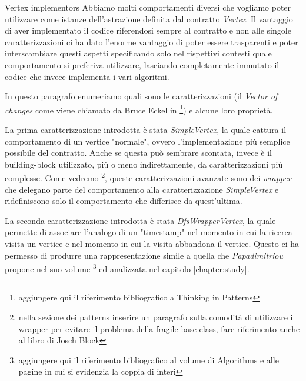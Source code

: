 \begin{paragraph}{Vertex implementors}
  Abbiamo molti comportamenti diversi che vogliamo poter utilizzare
  come istanze dell'astrazione definita dal contratto
  \emph{Vertex}. Il vantaggio di aver implementato il codice
  riferendosi sempre al contratto e non alle singole caratterizzazioni
  ci ha dato l'enorme vantaggio di poter essere trasparenti e poter
  interscambiare questi aspetti specificando solo nel rispettivi
  contesti quale comportamento si preferiva utilizzare, lasciando
  completamente immutato il codice che invece implementa i vari
  algoritmi.

  In questo paragrafo enumeriamo quali sono le caratterizzazioni (il
  \emph{Vector of changes} come viene chiamato da Bruce Eckel in
  \footnote{aggiungere qui il riferimento bibliografico a Thinking in
    Patterns}) e alcune loro propriet\`a.

  La prima caratterizzazione introdotta \`e stata \emph{SimpleVertex},
  la quale cattura il comportamento di un vertice "normale", ovvero
  l'implementazione pi\`u semplice possibile del contratto. Anche se
  questa pu\`o sembrare scontata, invece \`e il building-block
  utilizzato, pi\`u o meno indirettamente, da caratterizzazioni pi\`u
  complesse. Come vedremo \footnote{nella sezione dei patterns
    inserire un paragrafo sulla comodit\`a di utilizzare i wrapper per
    evitare il problema della fragile base class, fare riferimento
    anche al libro di Josch Block}, queste caratterizzazioni avanzate
  sono dei \emph{wrapper} che delegano parte del comportamento alla
  caratterizzazione \emph{SimpleVertex} e ridefiniscono solo il
  comportamento che differisce da quest'ultima.

  La seconda caratterizzazione introdotta \`e stata
  \emph{DfsWrapperVertex}, la quale permette di associare l'analogo di
  un "timestamp" nel momento in cui la ricerca visita un vertice e nel
  momento in cui la visita abbandona il vertice. Questo ci ha permesso
  di produrre una rappresentazione simile a quella che
  \emph{Papadimitriou} propone nel suo volume \footnote{aggiungere qui
    il riferimento bibliografico al volume di Algorithms e alle pagine
    in cui si evidenzia la coppia di interi} ed analizzata nel
  capitolo \ref{chapter:study}.


\end{paragraph}
